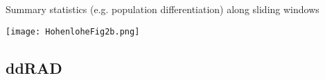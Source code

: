 \documentclass[presentation]{beamer}
\begin{document}
\begin{frame}[label={sec:org7872fa5}]{Summary statistics (e.g. population differentiation) along sliding windows}
\begin{latex}
\begin{center}
\end{latex}

\begin{center}
\texttt{[image: HohenloheFig2b.png]}
\end{center}

\end{frame}




\subsection{ddRAD}
\label{sec:orgf7d9364}
\end{document}
